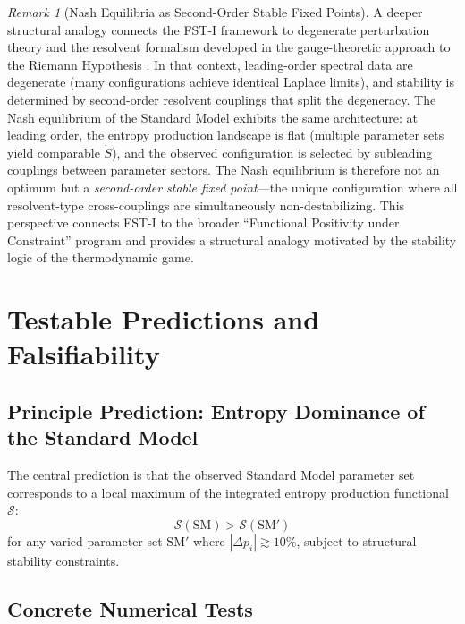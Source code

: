 \documentclass[12pt,a4paper]{article}
\theoremstyle{remark}
\newtheorem{remark}{Remark}
\begin{document}
\begin{remark}[Nash Equilibria as Second-Order Stable Fixed Points]
\label{rem:degenerate-perturbation}
A deeper structural analogy connects the FST-I framework to degenerate perturbation theory and the resolvent formalism developed in the gauge-theoretic approach to the Riemann Hypothesis \citep{GeigerRH2026b}. In that context, leading-order spectral data are degenerate (many configurations achieve identical Laplace limits), and stability is determined by second-order resolvent couplings that split the degeneracy. The Nash equilibrium of the Standard Model exhibits the same architecture: at leading order, the entropy production landscape is flat (multiple parameter sets yield comparable $\dot{S}$), and the observed configuration is selected by subleading couplings between parameter sectors. The Nash equilibrium is therefore not an optimum but a \emph{second-order stable fixed point}---the unique configuration where all resolvent-type cross-couplings are simultaneously non-destabilizing. This perspective connects FST-I to the broader ``Functional Positivity under Constraint'' program and provides a structural analogy motivated by the stability logic of the thermodynamic game.
\end{remark}

\section{Testable Predictions and Falsifiability}
\label{sec:predictions}

\subsection{Principle Prediction: Entropy Dominance of the Standard Model}

The central prediction is that the observed Standard Model parameter set corresponds to a local maximum of the integrated entropy production functional $\mathcal{S}$:
\begin{equation}
\mathcal{S}(\text{SM}) > \mathcal{S}(\text{SM}')
\end{equation}
for any varied parameter set $\text{SM}'$ where $|\Delta p_i| \gtrsim 10\%$, subject to structural stability constraints.

\subsection{Concrete Numerical Tests}
\end{document}
